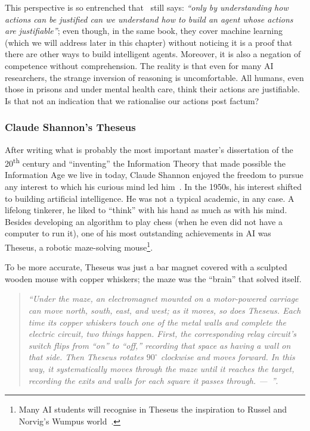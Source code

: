 This perspective is so entrenched that~\citeauthor[p. 7]{russell:2010} still says: \emph{``only by understanding how actions can be justified can we understand how to build an agent whose actions are justifiable''}; even though, in the same book, they cover machine learning (which we will address later in this chapter) without noticing it is a proof that there are other ways to build intelligent agents. Moreover, it is also a negation of competence without comprehension. The reality is that even for many AI researchers, the strange inversion of reasoning is uncomfortable. All humans, even those in prisons and under mental health care, think their actions are justifiable. Is that not an indication that we rationalise our actions post factum?

\subsubsection{Claude Shannon’s Theseus}
After writing what is probably the most important master's dissertation of the 20\textsuperscript{th} century and ``inventing'' the Information Theory that made possible the Information Age we live in today, Claude Shannon enjoyed the freedom to pursue any interest to which his curious mind led him~\cite{soni:2017}. In the 1950s, his interest shifted to building artificial intelligence. He was not a typical academic, in any case. A lifelong tinkerer, he liked to ``think'' with his hand as much as with his mind. Besides developing an algorithm to play chess (when he even did not have a computer to run it), one of his most outstanding achievements in AI was Theseus, a robotic maze-solving mouse\footnote{Many AI students will recognise in Theseus the inspiration to Russel and Norvig's Wumpus world~\cite{russel:2010}.}.

To be more accurate, Theseus was just a bar magnet covered with a sculpted wooden mouse with copper whiskers; the maze was the ``brain'' that solved itself.
\begin{quote}
	\small \emph{``Under the maze, an electromagnet mounted on a motor-­powered carriage can move north, south, east, and west; as it moves, so does Theseus. Each time its copper whiskers touch one of the metal walls and complete the electric circuit, two things happen. First, the corresponding relay circuit's switch flips from ``on'' to ``off,'' recording that space as having a wall on that side. Then Theseus rotates \(90^{\circ}\) clockwise and moves forward. In this way, it systematically moves through the maze until it reaches the target, recording the exits and walls for each square it passes through.\flushright{} ---~\citeauthor{klein:2018}''}.
\end{quote}
